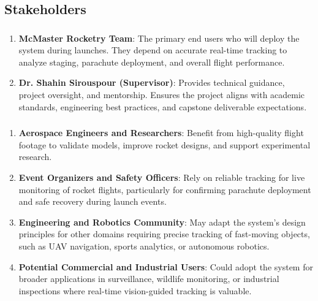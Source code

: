 \documentclass{article}
\begin{document}
\subsection{Stakeholders}

\subsubsection*{\color{blue}{Direct Stakeholders}}
\begin{enumerate}
    \item \textbf{McMaster Rocketry Team}: The primary end users who
          will deploy the system during launches. They depend on accurate
          real-time tracking to analyze staging, parachute deployment, and
          overall flight performance.

    \item \textbf{Dr. Shahin Sirouspour (Supervisor)}: Provides
          technical guidance, project oversight, and mentorship. Ensures
          the project aligns with academic standards, engineering best
          practices, and capstone deliverable expectations.
\end{enumerate}

\subsubsection*{\color{blue}{Indirect Stakeholders}}
\begin{enumerate}
    \item \textbf{Aerospace Engineers and Researchers}: Benefit from
          high-quality flight footage to validate models, improve rocket
          designs, and support experimental research.

    \item \textbf{Event Organizers and Safety Officers}: Rely on
          reliable tracking for live monitoring of rocket flights,
          particularly for confirming parachute deployment and safe
          recovery during launch events.

    \item \textbf{Engineering and Robotics Community}: May adapt the
          system’s design principles for other domains requiring precise
          tracking of fast-moving objects, such as UAV navigation, sports
          analytics, or autonomous robotics.

    \item \textbf{Potential Commercial and Industrial Users}: Could
          adopt the system for broader applications in surveillance,
          wildlife monitoring, or industrial inspections where real-time
          vision-guided tracking is valuable.
\end{enumerate}
\end{document}
